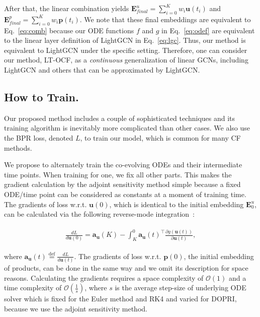 \documentclass[sigconf]{acmart}
\begin{document}
After that, the linear combination yields $\bm{E}^u_{final} = \sum_{i=0}^{K}w_i\bm{u}(t_i)$ and $\bm{E}^p_{final} = \sum_{i=0}^{K}w_i\bm{p}(t_i)$. We note that these final embeddings are equivalent to Eq.~\eqref{eq:comb} because our ODE functions $f$ and $g$ in Eq.~\eqref{eq:odef} are equivalent to the linear layer definition of LightGCN in Eq.~\eqref{eq:lgc}. Thus, our method is equivalent to LightGCN under the specific setting. Therefore, one can consider our method, LT-OCF, as a \emph{continuous} generalization of linear GCNs, including LightGCN and others that can be approximated by LightGCN.

\subsection{How to Train.}\label{sec:tra}
Our proposed method includes a couple of sophisticated techniques and its training algorithm is inevitably more complicated than other cases. We also use the BPR loss, denoted $L$, to train our model, which is common for many CF methods.

We propose to alternately train the co-evolving ODEs and their intermediate time points. When training for one, we fix all other parts. This makes the gradient calculation by the adjoint sensitivity method simple because a fixed ODE/time point can be considered as constants at a moment of training time. The gradients of loss w.r.t. $\bm{u}(0)$, which is identical to the initial embedding $\bm{E}^u_0$, can be calculated via the following reverse-mode integration~\cite{NIPS2018_7892}:
\begin{linenomath*}\begin{align}\begin{split}
    \frac{d L}{d \bm{u}(0)} =  \bm{a}_{\bm{u}}(K) - \int_{K}^{0}\bm{a}_{\bm{u}}(t)^\intercal\frac{\partial g(\bm{u}(t))}{\partial \bm{u}(t)},
\end{split}\end{align}\end{linenomath*}where $\bm{a}_{\bm{u}}(t) \stackrel{\text{def}}{=} \frac{d L}{d \bm{u}(t)}$. The gradients of loss w.r.t. $\bm{p}(0)$, the initial embedding of products, can be done in the same way and we omit its description for space reasons. Calculating the gradients requires a space complexity of $\mathcal{O}(1)$ and a time complexity of $\mathcal{O}(\frac{1}{s})$, where $s$ is the average step-size of underlying ODE solver which is fixed for the Euler method and RK4 and varied for DOPRI, because we use the adjoint sensitivity method.
\end{document}

